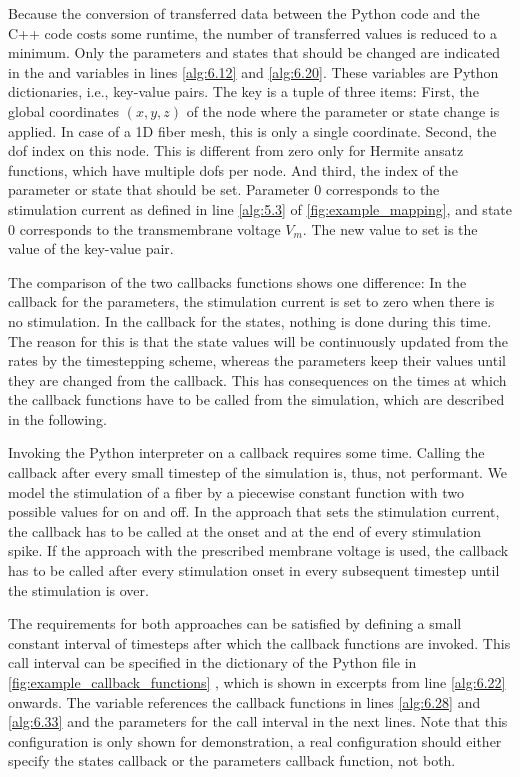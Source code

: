 Because the conversion of transferred data between the Python code and the C++ code costs some runtime, the number of transferred values is reduced to a minimum. Only the parameters and states that should be changed are indicated in the  and  variables in lines \ref{alg:6.12} and \ref{alg:6.20}. These variables are Python dictionaries, i.e., key-value pairs. The key is a tuple of three items: First, the global coordinates $(x,y,z)$ of the node where the parameter or state change is applied. In case of a 1D fiber mesh, this is only a single coordinate. Second, the dof index on this node. This is different from zero only for Hermite ansatz functions, which have multiple dofs per node. And third, the index of the parameter or state that should be set. Parameter 0 corresponds to the stimulation current as defined in line \ref{alg:5.3} of \cref{fig:example_mapping}, and state 0 corresponds to the transmembrane voltage $V_m$. The new value to set is the value of the key-value pair.

The comparison of the two callbacks functions shows one difference: In the callback for the parameters, the stimulation current is set to zero when there is no stimulation. In the callback for the states, nothing is done during this time. The reason for this is that the state values will be continuously updated from the rates by the timestepping scheme, whereas the parameters keep their values until they are changed from the callback. This has consequences on the times at which the callback functions have to be called from the simulation, which are described in the following.

Invoking the Python interpreter on a callback requires some time. Calling the callback after every small timestep of the simulation is, thus, not performant. We model the stimulation of a fiber by a piecewise constant function with two possible values for on and off.
In the approach that sets the stimulation current, the callback  has to be called at the onset and at the end of every stimulation spike. If the approach with the prescribed membrane voltage is used, the callback  has to be called after every stimulation onset in every subsequent timestep until the stimulation is over.

The requirements for both approaches can be satisfied by defining a small constant interval of timesteps after which the callback functions are invoked. This call interval can be specified in the  dictionary of the Python file in \cref{fig:example_callback_functions} , which is shown in excerpts from line \ref{alg:6.22} onwards. The  variable references the callback functions in lines \ref{alg:6.28} and \ref{alg:6.33} and the parameters for the call interval in the next lines. Note that this configuration is only shown for demonstration, a real configuration should either specify the states callback or the parameters callback function, not both.

